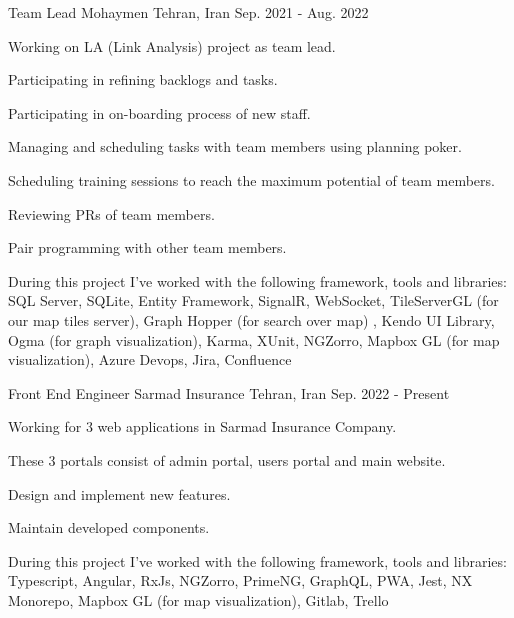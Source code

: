 \begin{cventries}
  \cventry
    {Team Lead} %
    {Mohaymen} %
    {Tehran, Iran} %
    {Sep. 2021 - Aug. 2022} %
    {
    	\begin{cvitems} %
    		\item {Working on LA (Link Analysis) project as team lead.}
    		\item {Participating in refining backlogs and tasks.}
    		\item {Participating in on-boarding process of new staff.}
    		\item {Managing and scheduling tasks with team members using planning poker.}
    		\item {Scheduling training sessions to reach the maximum potential of team members.}
    		\item {Reviewing PRs of team members.}
    		\item {Pair programming with other team members.}
    		\item {During this project I've worked with the following framework, tools and libraries: SQL Server, SQLite, Entity Framework, SignalR, WebSocket, TileServerGL (for our map tiles server), Graph Hopper (for search over map) , Kendo UI Library, Ogma (for graph visualization), Karma, XUnit, NGZorro, Mapbox GL (for map visualization), Azure Devops, Jira, Confluence}
    	\end{cvitems}
    }

  \cventry
    {Front End Engineer} %
    {Sarmad Insurance} %
    {Tehran, Iran} %
    {Sep. 2022 - Present} %
    {
      \begin{cvitems} %
      	\item {Working for 3 web applications in Sarmad Insurance Company.}
      	\item {These 3 portals consist of admin portal, users portal and main website.}
        \item {Design and implement new features.}
        \item {Maintain developed components.}
        \item {During this project I've worked with the following framework, tools and libraries: Typescript, Angular, RxJs, NGZorro, PrimeNG, GraphQL, PWA, Jest, NX Monorepo, Mapbox GL (for map visualization), Gitlab, Trello}
      \end{cvitems}
    }


\end{cventries}
